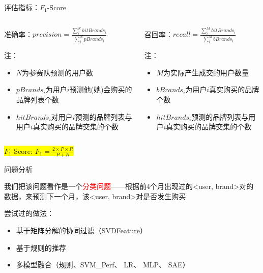 \documentclass{beamer}
\begin{document}
\begin{frame}{评估指标：$F_1$-Score}

\begin{columns}[c]

\begin{column}{0.5\textwidth}
准确率：$precision = \frac{\sum_i^N hitBrands_i}{\sum_i^N pBrands_i}$

\vspace{1em}

注：
\begin{itemize}
\item $N$为参赛队预测的用户数
\item $pBrands_i$为用户$i$预测他(她)会购买的品牌列表个数 
\item $hitBrands_i$对用户$i$预测的品牌列表与用户$i$真实购买的品牌交集的个数
\end{itemize}
\end{column}

\begin{column}{0.5\textwidth}
召回率：$recall = \frac{\sum_i^M hitBrands_i}{\sum_i^M bBrands_i}$

\vspace{1em}

注：
\begin{itemize}
\item $M$为实际产生成交的用户数量
\item $bBrands_i$为用户$i$真实购买的品牌个数 
\item $hitBrands_i$预测的品牌列表与用户$i$真实购买的品牌交集的个数
\end{itemize}
\end{column}

\end{columns}

\vspace{1em}

\begin{center}
\colorbox{yellow}{$F_1$-Score: $F_1 = \frac{2 \times P \times R}{P + R}$}
\end{center}

\end{frame}

\begin{frame}{问题分析}

我们把该问题看作是一个\textcolor{red}{分类问题}——根据前4个月出现过的<user, brand>对的数据，来预测下一个月，该<user, brand>对是否发生购买

\vspace{1cm}

尝试过的做法：
\begin{itemize}
\item 基于矩阵分解的协同过滤（SVDFeature）
\item 基于规则的推荐
\item 多模型融合（规则、SVM\_Perf、 LR、 MLP、 SAE）
\end{itemize}

\end{frame}
\end{document}

